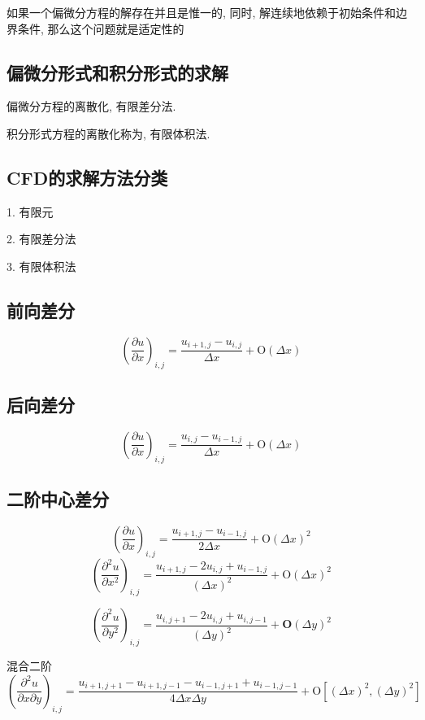 如果一个偏微分方程的解存在并且是惟一的, 同时, 解连续地依赖于初始条件和边界条件, 那么这个问题就是适定性的

\subsection{偏微分形式和积分形式的求解}
偏微分方程的离散化, 有限差分法.

积分形式方程的离散化称为, 有限体积法.

\subsection{CFD的求解方法分类}
1. 有限元

2. 有限差分法

3. 有限体积法
\subsection{前向差分}
$$
	\left(\frac{\partial u}{\partial x}\right)_{i, j}=\frac{u_{i+1, j}-u_{i, j}}{\Delta x}+\mathrm{O}(\Delta x)
$$

\subsection{后向差分}
$$
	\left(\frac{\partial u}{\partial x}\right)_{i, j}=\frac{u_{i, j}-u_{i-1, j}}{\Delta x}+\mathrm{O}(\Delta x)
$$

\subsection{二阶中心差分}
$$
	\left(\frac{\partial u}{\partial x}\right)_{i, j}=\frac{u_{i+1, j}-u_{i-1, j}}{2 \Delta x}+\mathrm{O}(\Delta x)^{2}
$$
$$
	\left(\frac{\partial^{2} u}{\partial x^{2}}\right)_{i, j}=\frac{u_{i+1, j}-2 u_{i, j}+u_{i-1, j}}{(\Delta x)^{2}}+\mathrm{O}(\Delta x)^{2}
$$

$$
	\left(\frac{\partial^{2} u}{\partial y^{2}}\right)_{i, j}=\frac{u_{i, j+1}-2 u_{i, j}+u_{i, j-1}}{(\Delta y)^{2}}+\mathbf{O}(\Delta y)^{2}
$$

混合二阶
$$
	\left(\frac{\partial^{2} u}{\partial x \partial y}\right)_{i, j}=\frac{u_{i+1, j+1}-u_{i+1, j-1}-u_{i-1, j+1}+u_{i-1, j-1}}{4 \Delta x \Delta y}+\mathrm{O}\left[(\Delta x)^{2},(\Delta y)^{2}\right]
$$

